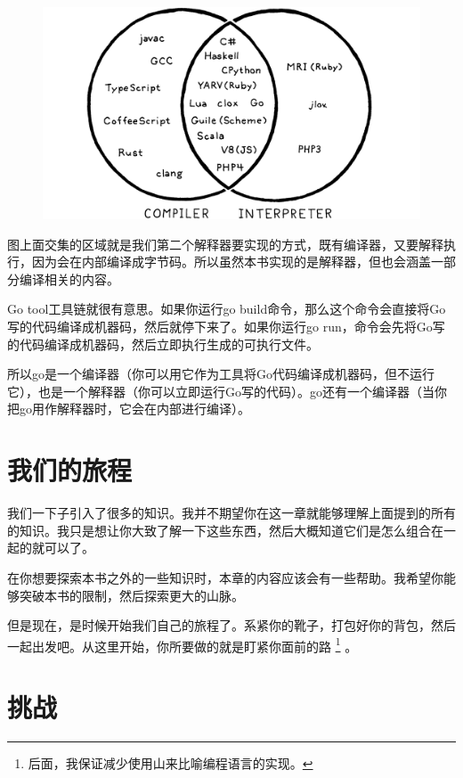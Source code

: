 \documentclass[cn,10pt,math=newtx,citestyle=gb7714-2015,bibstyle=gb7714-2015]{elegantbook}
\begin{document}
\begin{figure}[h]
\centering
\includegraphics[width=\textwidth]{./image/a-map-of-the-territory/venn.png}
\end{figure}

图上面交集的区域就是我们第二个解释器要实现的方式，既有编译器，又要解释执行，因为会在内部编译成字节码。所以虽然本书实现的是解释器，但也会涵盖一部分编译相关的内容。

\begin{tcolorbox}
Go tool工具链就很有意思。如果你运行go build命令，那么这个命令会直接将Go写的代码编译成机器码，然后就停下来了。如果你运行go run，命令会先将Go写的代码编译成机器码，然后立即执行生成的可执行文件。

所以go是一个编译器（你可以用它作为工具将Go代码编译成机器码，但不运行它），也是一个解释器（你可以立即运行Go写的代码）。go还有一个编译器（当你把go用作解释器时，它会在内部进行编译）。
\end{tcolorbox}

\section{我们的旅程}

我们一下子引入了很多的知识。我并不期望你在这一章就能够理解上面提到的所有的知识。我只是想让你大致了解一下这些东西，然后大概知道它们是怎么组合在一起的就可以了。

在你想要探索本书之外的一些知识时，本章的内容应该会有一些帮助。我希望你能够突破本书的限制，然后探索更大的山脉。

但是现在，是时候开始我们自己的旅程了。系紧你的靴子，打包好你的背包，然后一起出发吧。从这里开始，你所要做的就是盯紧你面前的路 \footnote{后面，我保证减少使用山来比喻编程语言的实现。} 。

\section{挑战}
\end{document}
